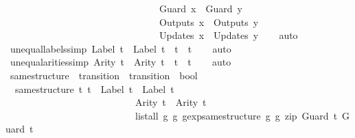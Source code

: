 \begin{isabellebody}
\ \ \ \ \ \ \ \ \ \ \ \ \ \ \ \ \ \ \ \ \ \ \ \ \ \ \ \ \ \ \ \ {\isacharparenleft}Guard\ x{\isacharparenright}\ {\isacharequal}\ {\isacharparenleft}Guard\ y{\isacharparenright}\ {\isasymand}\isanewline
\ \ \ \ \ \ \ \ \ \ \ \ \ \ \ \ \ \ \ \ \ \ \ \ \ \ \ \ \ \ \ \ {\isacharparenleft}Outputs\ x{\isacharparenright}\ {\isacharequal}\ {\isacharparenleft}Outputs\ y{\isacharparenright}\ {\isasymand}\isanewline
\ \ \ \ \ \ \ \ \ \ \ \ \ \ \ \ \ \ \ \ \ \ \ \ \ \ \ \ \ \ \ \ {\isacharparenleft}Updates\ x{\isacharparenright}\ {\isacharequal}\ {\isacharparenleft}Updates\ y{\isacharparenright}{\isacharparenright}{\isachardoublequoteclose}\isanewline
%
\isadelimproof
\ \ %
\endisadelimproof
%
\isatagproof
{}\isamarkupfalse%
\ auto%
\endisatagproof
{\isafoldproof}%
%
\isadelimproof
\isanewline
%
\endisadelimproof
\isanewline
{}\isamarkupfalse%
\ unequal{\isacharunderscore}labels{\isacharbrackleft}simp{\isacharbrackright}{\isacharcolon}\ {\isachardoublequoteopen}Label\ t{}\ {\isasymnoteq}\ Label\ t{}\ {\isasymLongrightarrow}\ t{}\ {\isasymnoteq}\ t{}{\isachardoublequoteclose}\isanewline
%
\isadelimproof
\ \ %
\endisadelimproof
%
\isatagproof
{}\isamarkupfalse%
\ auto%
\endisatagproof
{\isafoldproof}%
%
\isadelimproof
\isanewline
%
\endisadelimproof
\isanewline
{}\isamarkupfalse%
\ unequal{\isacharunderscore}arities{\isacharbrackleft}simp{\isacharbrackright}{\isacharcolon}\ {\isachardoublequoteopen}Arity\ t{}\ {\isasymnoteq}\ Arity\ t{}\ {\isasymLongrightarrow}\ t{}\ {\isasymnoteq}\ t{}{\isachardoublequoteclose}\isanewline
%
\isadelimproof
\ \ %
\endisadelimproof
%
\isatagproof
{}\isamarkupfalse%
\ auto%
\endisatagproof
{\isafoldproof}%
%
\isadelimproof
\isanewline
%
\endisadelimproof
\isanewline
{}\isamarkupfalse%
\ same{\isacharunderscore}structure\ {\isacharcolon}{\isacharcolon}\ {\isachardoublequoteopen}transition\ {\isasymRightarrow}\ transition\ {\isasymRightarrow}\ bool{\isachardoublequoteclose}\ \isanewline
\ \ {\isachardoublequoteopen}same{\isacharunderscore}structure\ t{}\ t{}\ {\isacharequal}\ {\isacharparenleft}Label\ t{}\ {\isacharequal}\ Label\ t{}\ {\isasymand}\isanewline
\ \ \ \ \ \ \ \ \ \ \ \ \ \ \ \ \ \ \ \ \ \ \ \ \ \ \ Arity\ t{}\ {\isacharequal}\ Arity\ t{}\ {\isasymand}\isanewline
\ \ \ \ \ \ \ \ \ \ \ \ \ \ \ \ \ \ \ \ \ \ \ \ \ \ \ list{\isacharunderscore}all\ {\isacharparenleft}{\isasymlambda}{\isacharparenleft}g{}{\isacharcomma}\ g{}{\isacharparenright}{\isachardot}\ gexp{\isacharunderscore}same{\isacharunderscore}structure\ g{}\ g{}{\isacharparenright}\ {\isacharparenleft}zip\ {\isacharparenleft}Guard\ t{}{\isacharparenright}\ {\isacharparenleft}Guard\ t{}{\isacharparenright}{\isacharparenright}{\isacharparenright}{\isachardoublequoteclose}\isanewline

\end{isabellebody}
